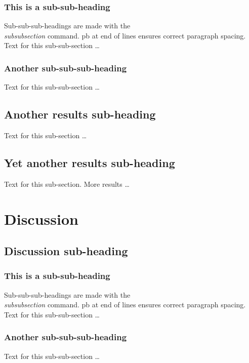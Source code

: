 \documentclass[10pt]{bmc_article}
\newenvironment{bmcformat}{\begin{raggedright}\baselineskip20pt\sloppy\setboolean{publ}{false}}{\end{raggedright}\baselineskip20pt\sloppy}
\begin{document}
\begin{bmcformat}
    \subsubsection*{This is a sub-sub-heading}
      Sub-sub-sub-headings are made with the \textsl{\\subsubsection} command. \pb
      pb at end of lines ensures correct paragraph spacing.\pb
	  Text for this sub-sub-section \ldots
    \subsubsection*{Another sub-sub-sub-heading}
      Text for this sub-sub-section \ldots

  \subsection*{Another results sub-heading}
    Text for this sub-section \ldots

  \subsection*{Yet another results sub-heading}
    Text for this sub-section.  More results \ldots


\section*{Discussion}
  \subsection*{Discussion sub-heading}
    \subsubsection*{This is a sub-sub-heading}
      Sub-sub-sub-headings are made with the \textsl{\\subsubsection} command. \pb
      pb at end of lines ensures correct paragraph spacing.\pb
	  Text for this sub-sub-section \ldots
    \subsubsection*{Another sub-sub-sub-heading}
      Text for this sub-sub-section \ldots


\end{bmcformat}
\end{document}
